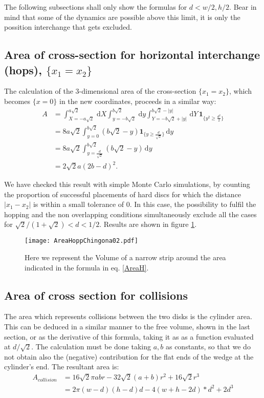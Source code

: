 \documentclass[a4paper,10pt, jcp, aps, preprint]{revtex4-1}
\newcommand{\rd}{\, \mathrm{d}}
\newcommand{\indicator}[1]{\mathbf{1}_{ \{   #1 \} } }
\begin{document}
The following subsections shall only show the formulas for $d<w/2, h/2$.
Bear in mind that some of the dynamics are possible above this limit,
it is only the possition interchange that gets excluded. 

\subsection{Area of cross-section for horizontal interchange (hops), 
$\{x_1 = x_2\}$}

The calculation of the $3$-dimensional area of the cross-section 
$\{x_1 = x_2\}$, which becomes 
$\{ x=0 \}$ in the new coordinates, proceeds in a similar way:
\begin{align}
 A &= \int_{X=-a \sqrt{2} }^{a \sqrt{2}}  \rd X
 \int_{y=-b \sqrt{2}}^{b \sqrt{2}} \rd y
\int_{Y=-b \sqrt{2} + |y| }^{b \sqrt{2}-|y|}  \rd Y
\, \indicator{y^2 \ge \frac{d^2}{2} } \\
&= 8 a \sqrt{2} \int_{y=0}^{b \sqrt{2}} 
\left( b \sqrt{2} - y \right)  \indicator{y \ge \frac{d}{\sqrt{2}}}  \rd y \\
&= 8 a \sqrt{2} \int_{y= \frac{d}{\sqrt{2}}}^{b \sqrt{2}}  \left( b \sqrt{2} - y \right)  \rd y \\
&= 2 \sqrt{2} a ( 2b - d )^2. \label{AreaH}
\end{align}

We have checked this result with simple Monte Carlo simulations, 
by counting the proportion of successful placements of hard discs for which the distance 
$|x_1 - x_2|$ is within a small tolerance of $0$. In this case, the possibility to fulfil
the hopping and the non overlapping conditions simultaneously exclude 
all the cases for $\sqrt{2}/(1+\sqrt{2}) <d<1/2$. Results are shown in figure \ref{AreaHopp01}.

\begin{figure}[h]
\centering
\texttt{[image: AreaHoppChingona02.pdf]}
\caption{Here we represent the Volume of a narrow strip around the area
  indicated in the formula in eq. \ref{AreaH}.} 
\label{AreaHopp01}
\end{figure}


\subsection{Area of cross section for collisions}

The area which represents collisions between the two disks is the cylinder area. 
This can be deduced in a similar manner to the free volume, shown in the last
section, or as the derivative of this formula, taking it as as a function evaluated at 
$d/\sqrt{2}$. The calculation must be done taking $a,b$ as constants, so that
we do not obtain also the (negative) contribution for the flat ends of
the wedge at the cylinder's end. The resultant area is:
\begin{align}\label{AreaChoque}
A_{collision} & =  16\sqrt{2}\pi a b r -32\sqrt{2} (a+b)r^2 +16\sqrt{2} r^3 \\
& =  2 \pi (w-d)(h-d)d  -4 (w+h-2d)*d^2 +2 d^3 %
\end{align}
\end{document}
